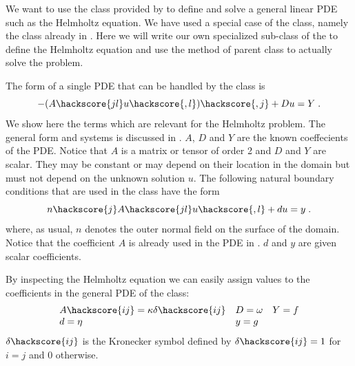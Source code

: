 We want to use the \LinearPDE class provided by \escript to define and solve a general linear PDE such as the 
Helmholtz equation. We have used a special case of the \LinearPDE class, namely the
\Poisson class already in . 
Here we will write our own specialized sub-class of the \LinearPDE to define the Helmholtz equation
and use the  method of parent class to actually solve the problem.

The form of a single PDE that can be handled by the \LinearPDE class is 
\begin{equation}\label{EQU.FEM.1}
-(A\hackscore{jl} u\hackscore{,l})\hackscore{,j}+D u =Y \; .
\end{equation}
We show here the terms which are relevant for the Helmholtz problem. 
The general form and systems is discussed in .  
$A$, $D$ and $Y$ are the known coeffecients of the PDE.  
Notice that $A$ is a matrix or tensor of order 2 and $D$ and $Y$ are scalar. 
They may be constant or may depend on their 
location in the domain but must not depend on the unknown solution $u$. 
The following natural boundary conditions  that
are used in the \LinearPDE class have the form
\begin{equation}\label{EQU.FEM.2}
n\hackscore{j}A\hackscore{jl} u\hackscore{,l}+du=y  \;.
\end{equation}
where, as usual, $n$ denotes the outer normal field on the surface of the domain. Notice that 
the coefficient $A$ is already used in the PDE in . $d$ and $y$ are given scalar coefficients.

By inspecting the Helmholtz equation  
we can easily assign values to the coefficients in the 
general PDE of the \LinearPDE class:
\begin{equation}\label{DIFFUSION HELM EQ 3}
\begin{array}{llllll}
A\hackscore{ij}=\kappa \delta\hackscore{ij} & D=\omega & Y=f \\
d=\eta & y= g &  \\
\end{array}
\end{equation}
$\delta\hackscore{ij}$ is the Kronecker symbol  defined by $\delta\hackscore{ij}=1$ for
$i=j$ and $0$ otherwise.

